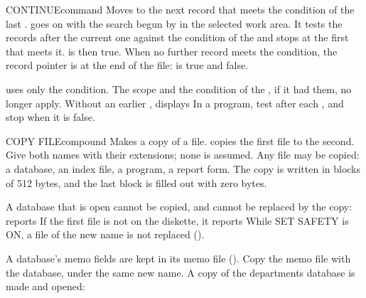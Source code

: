 \begin{XbaseEntry}{CONTINUE}{command}
Moves to the next record that meets the condition of the last .
\Syntax
{}
\Usage
{} goes on with the search begun by  in the selected
work area.  It tests the records after the current one against the
 condition of the  and stops at the first that meets it.
 is then true.  When no further record meets the condition, the
record pointer is at the end of the file:  is true and
 false.

 uses only the  condition.  The scope and the 
condition of the , if it had them, no longer apply.  Without an
earlier ,  displays
\Tips
In a program, test  after each , and stop when it is
false.
\Examples
{}
\end{XbaseEntry}

\begin{XbaseEntry}{COPY FILE}{compound}%
Makes a copy of a file.
\Syntax
{}
\Usage
{} copies the first file to the second.  Give both names with
their extensions; none is assumed.  Any file may be copied: a database, an
index file, a program, a report form.  The copy is written in blocks of 512
bytes, and the last block is filled out with zero bytes.

A database that is open cannot be copied, and cannot be replaced by the copy:
 reports   If the first file is
not on the diskette, it reports   While SET
SAFETY is ON, a file of the new name is not replaced
().

A database's memo fields are kept in its memo file ().  Copy the
memo file with the database, under the same new name.
\Examples
A copy of the departments database is made and opened:
\end{XbaseEntry}


